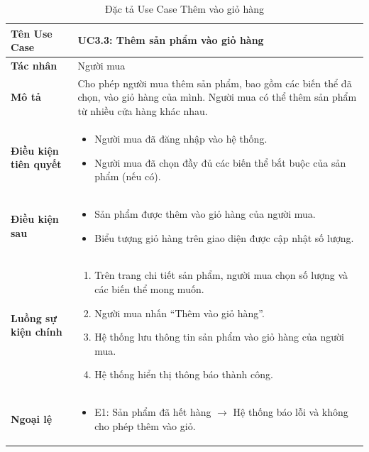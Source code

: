 \begin{table}[H]
\centering
\begin{tabularx}{\textwidth}{|l|X|}
\hline
\textbf{Tên Use Case} & \textbf{UC3.3: Thêm sản phẩm vào giỏ hàng} \\ \hline
\textbf{Tác nhân} & Người mua \\ \hline
\textbf{Mô tả} & Cho phép người mua thêm sản phẩm, bao gồm các biến thể đã chọn, vào giỏ hàng của mình. Người mua có thể thêm sản phẩm từ nhiều cửa hàng khác nhau. \\ \hline
\textbf{Điều kiện tiên quyết} & 
\begin{itemize}
    \item Người mua đã đăng nhập vào hệ thống.
    \item Người mua đã chọn đầy đủ các biến thể bắt buộc của sản phẩm (nếu có).
\end{itemize} \\ \hline
\textbf{Điều kiện sau} & 
\begin{itemize}
    \item Sản phẩm được thêm vào giỏ hàng của người mua.
    \item Biểu tượng giỏ hàng trên giao diện được cập nhật số lượng.
\end{itemize} \\ \hline
\textbf{Luồng sự kiện chính} & 
\begin{enumerate}
    \item Trên trang chi tiết sản phẩm, người mua chọn số lượng và các biến thể mong muốn.
    \item Người mua nhấn ``Thêm vào giỏ hàng''.
    \item Hệ thống lưu thông tin sản phẩm vào giỏ hàng của người mua.
    \item Hệ thống hiển thị thông báo thành công.
\end{enumerate} \\ \hline
\textbf{Ngoại lệ} & 
\begin{itemize}
    \item E1: Sản phẩm đã hết hàng $\rightarrow$ Hệ thống báo lỗi và không cho phép thêm vào giỏ.
\end{itemize} \\ \hline
\end{tabularx}
\caption{Đặc tả Use Case Thêm vào giỏ hàng}
\end{table}

